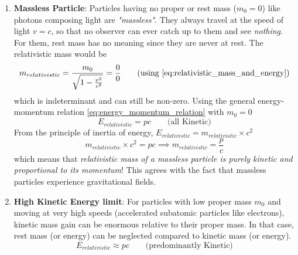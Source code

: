 \documentclass[11pt, a4paper]{article}
\begin{document}
\begin{enumerate}
	\item \textbf{Massless Particle}: Particles having no proper or rest mass ($m_{0} = 0$) like photons composing light are \textit{"massless"}. They always travel at the speed of light $v=c$, so that no observer can ever catch up to them and see \textit{nothing}. For them, rest mass has no meaning since they are never at rest. The relativistic mass would be
	\begin{equation*}
			m_{relativistic} = \frac{m_{0}}{\sqrt{1 - \frac{v^{2}}{c^{2}}}} = \frac{0}{0} \tag{using \eqref{eq:relativistic_mass_and_energy}}
	\end{equation*}
	which is indeterminant and can still be non-zero. Using the general energy-momentum relation \eqref{eq:energy_momentum_relation} with $m_{0} = 0$
	\begin{equation}\label{eq:E_equals_pc_massless}
		\boxed{E_{relativistic} = pc} \qquad \text{(all Kinetic)}
	\end{equation}
	From the principle of inertia of energy, $E_{relativistic} = m_{relativistic} \times c^{2}$
	\begin{equation}\label{eq:relativistic_mass_eq_p_by_c}
		m_{relativistic} \times c^{2} = pc \implies \boxed{m_{relativistic} = \frac{p}{c}}
	\end{equation}
	which means that \textit{relativistic mass of a massless particle is purely kinetic and proportional to its momentum}! This agrees with the fact that massless particles experience gravitational fields.
	
	\item \textbf{High Kinetic Energy limit}: For particles with low proper mass $m_{0}$ and moving at very high speeds (accelerated subatomic particles like electrons), kinetic mass gain can be enormous relative to their proper mass. In that case, rest mass (or energy) can be neglected compared to kinetic mass (or energy).
	\begin{equation}\label{eq:E_equals_pc_high_kinetic_energy}
		\boxed{E_{relativistic} \approx pc} \qquad \text{(predominantly Kinetic)}
	\end{equation}


\end{enumerate}
\end{document}
